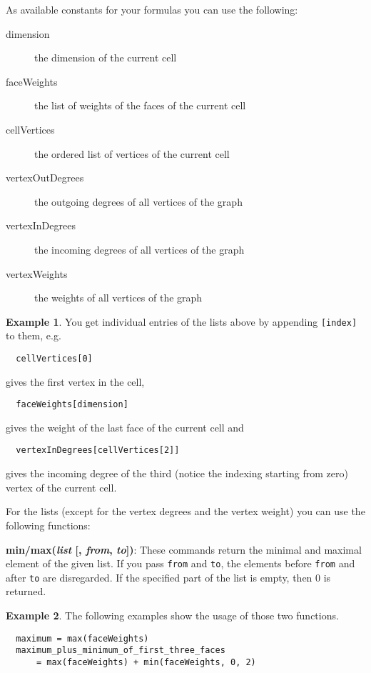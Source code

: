\documentclass{amsart}
\theoremstyle{definition}
\newtheorem*{example*}{Example}
\begin{document}
As available constants for your formulas you can use the following:
\begin{description}
  \item[dimension] the dimension of the current cell
  \item[faceWeights] the list of weights of the faces of the current cell
  \item[cellVertices] the ordered list of vertices of the current cell
  \item[vertexOutDegrees] the outgoing degrees of all vertices of the graph
  \item[vertexInDegrees] the incoming degrees of all vertices of the graph
  \item[vertexWeights] the weights of all vertices of the graph
\end{description}
\begin{example*}
  You get individual entries of the lists above by appending \texttt{[index]} to them, e.g.
  \begin{verbatim}  cellVertices[0]\end{verbatim}
  gives the first vertex in the cell,
  \begin{verbatim}  faceWeights[dimension]\end{verbatim}
  gives the weight of the last face of the current cell and
  \begin{verbatim}  vertexInDegrees[cellVertices[2]]\end{verbatim}
  gives the incoming degree of the third (notice the indexing starting from zero) vertex of the
  current cell.
\end{example*}

For the lists (except for the vertex degrees and the vertex weight) you can use the following
functions:

\noindent
\textbf{min/max(\textit{list} [, \textit{from}, \textit{to}])}:
These commands return the minimal and maximal element of the given list.
If you pass \texttt{from} and \texttt{to}, the elements before \texttt{from} and after \texttt{to}
are disregarded.
If the specified part of the list is empty, then 0 is returned.
\begin{example*}
  The following examples show the usage of those two functions.
  \begin{verbatim}
  maximum = max(faceWeights)
  maximum_plus_minimum_of_first_three_faces
      = max(faceWeights) + min(faceWeights, 0, 2)
  \end{verbatim}
\end{example*}
\end{document}
